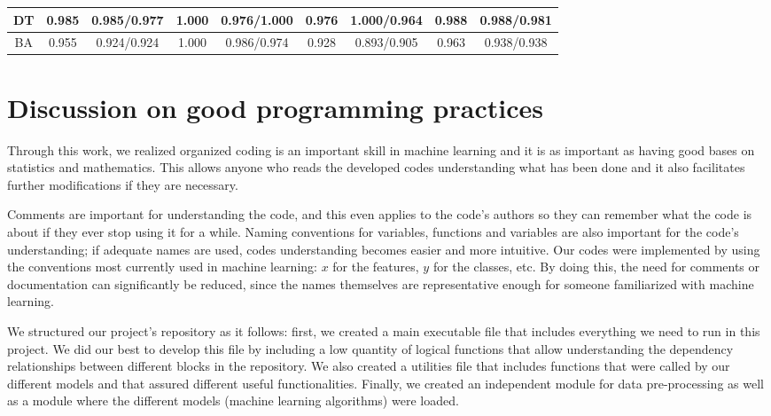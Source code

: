 \documentclass[11pt,a4paper]{article}
\begin{document}
\begin{table}[ht]
\begin{tabular}{|c|c|c|c|c|c|c|c|c|}
DT                                                                              & 0.985                                   & 0.985/0.977                                 & 1.000                                   & 0.976/1.000                                  & 0.976                                  & 1.000/0.964                                & 0.988                                & 0.988/0.981                              \\ \hline
BA                                                                              & 0.955                                   & 0.924/0.924                                 & 1.000                                   & 0.986/0.974                                  & 0.928                                  & 0.893/0.905                                & 0.963                                & 0.938/0.938                              \\ \hline
\end{tabular}
\label{tablePCA2}
\end{table}

\section{Discussion on good programming practices}
Through this work, we realized organized coding is an important skill in machine learning and it is as important as having good bases on statistics and mathematics. This allows anyone who reads the developed codes understanding what has been done and it also facilitates further modifications if they are necessary.

Comments are important for understanding the code, and this even applies to the code's authors so they can remember what the code is about if they ever stop using it for a while. Naming conventions for variables, functions and variables are also important for the code's understanding; if adequate names are used, codes understanding becomes easier and more intuitive. Our codes were implemented by using the conventions most currently used in machine learning: $x$ for the features, $y$ for the classes, etc. By doing this, the need for comments or documentation can significantly be reduced, since the names themselves are representative enough for someone familiarized with machine learning. 

We structured our project's repository as it follows: first, we created a main executable file that includes everything we need to run in this project. We did our best to develop this file by including a low quantity of logical functions that allow understanding the dependency relationships between different blocks in the repository.  We also created a utilities file that includes functions that were  called by our different models and that assured different useful functionalities. Finally, we created an independent module for data pre-processing as well as a module where the different models (machine learning algorithms) were loaded.
\end{document}
